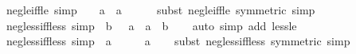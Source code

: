 \begin{isabellebody}
\endisatagproof
{\isafoldproof}%
%
\isadelimproof
\isanewline
%
\endisadelimproof
\isanewline
{}\isamarkupfalse%
\ neg{\isacharunderscore}{\kern0pt}{}{\isacharunderscore}{\kern0pt}le{\isacharunderscore}{\kern0pt}iff{\isacharunderscore}{\kern0pt}le\ {\isacharbrackleft}{\kern0pt}simp{\isacharbrackright}{\kern0pt}{\isacharcolon}{\kern0pt}\ {\isachardoublequoteopen}{}\ {\isasymle}\ {\isacharminus}{\kern0pt}\ a\ {\isasymlongleftrightarrow}\ a\ {\isasymle}\ {}{\isachardoublequoteclose}\isanewline
%
\isadelimproof
\ \ %
\endisadelimproof
%
\isatagproof
{}\isamarkupfalse%
\ {\isacharparenleft}{\kern0pt}subst\ neg{\isacharunderscore}{\kern0pt}le{\isacharunderscore}{\kern0pt}iff{\isacharunderscore}{\kern0pt}le\ {\isacharbrackleft}{\kern0pt}symmetric{\isacharbrackright}{\kern0pt}{\isacharparenright}{\kern0pt}\ simp%
\endisatagproof
{\isafoldproof}%
%
\isadelimproof
\isanewline
%
\endisadelimproof
\isanewline
{}\isamarkupfalse%
\ neg{\isacharunderscore}{\kern0pt}less{\isacharunderscore}{\kern0pt}iff{\isacharunderscore}{\kern0pt}less\ {\isacharbrackleft}{\kern0pt}simp{\isacharbrackright}{\kern0pt}{\isacharcolon}{\kern0pt}\ {\isachardoublequoteopen}{\isacharminus}{\kern0pt}\ b\ {\isacharless}{\kern0pt}\ {\isacharminus}{\kern0pt}\ a\ {\isasymlongleftrightarrow}\ a\ {\isacharless}{\kern0pt}\ b{\isachardoublequoteclose}\isanewline
%
\isadelimproof
\ \ %
\endisadelimproof
%
\isatagproof
{}\isamarkupfalse%
\ {\isacharparenleft}{\kern0pt}auto\ simp\ add{\isacharcolon}{\kern0pt}\ less{\isacharunderscore}{\kern0pt}le{\isacharparenright}{\kern0pt}%
\endisatagproof
{\isafoldproof}%
%
\isadelimproof
\isanewline
%
\endisadelimproof
\isanewline
{}\isamarkupfalse%
\ neg{\isacharunderscore}{\kern0pt}less{\isacharunderscore}{\kern0pt}{}{\isacharunderscore}{\kern0pt}iff{\isacharunderscore}{\kern0pt}less\ {\isacharbrackleft}{\kern0pt}simp{\isacharbrackright}{\kern0pt}{\isacharcolon}{\kern0pt}\ {\isachardoublequoteopen}{\isacharminus}{\kern0pt}\ a\ {\isacharless}{\kern0pt}\ {}\ {\isasymlongleftrightarrow}\ {}\ {\isacharless}{\kern0pt}\ a{\isachardoublequoteclose}\isanewline
%
\isadelimproof
\ \ %
\endisadelimproof
%
\isatagproof
{}\isamarkupfalse%
\ {\isacharparenleft}{\kern0pt}subst\ neg{\isacharunderscore}{\kern0pt}less{\isacharunderscore}{\kern0pt}iff{\isacharunderscore}{\kern0pt}less\ {\isacharbrackleft}{\kern0pt}symmetric{\isacharbrackright}{\kern0pt}{\isacharparenright}{\kern0pt}\ simp%
\endisatagproof
{\isafoldproof}%
%
\isadelimproof

\end{isabellebody}
